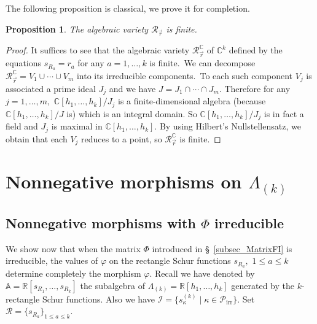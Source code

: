 \documentclass[10pt,a4paper]{amsart}
\newtheorem{prop}[theorem]{Proposition}
\theoremstyle{definition}
\DeclareMathOperator{\irr}{irr}
\begin{document}
The following proposition is classical, we prove it for completion.

\begin{prop}
\label{Prop_Variety}The algebraic variety $\mathcal{R}_{\vec{r}}$ is finite.
\end{prop}

\begin{proof}
It suffices to see that the algebraic variety $\mathcal{R}_{\vec{r}%
}^{\mathbb{C}}$ of $\mathbb{C}^{k}$ defined by the equations $s_{R_{a}}=r_{a}$
for any $a=1,\ldots,k$ is finite.\ We can decompose $\mathcal{R}_{\vec{r}%
}^{\mathbb{C}}=V_{1}\cup\cdots\cup V_{m}$ into its irreducible components.\ To
each such component $V_{j}$ is associated a prime ideal $J_{j}$ and we have
$J=J_{1}\cap\cdots\cap J_{m}$. Therefore for any $j=1,\ldots,m,$
$\mathbb{C}[h_{1},\ldots,h_{k}]/J_{j}$ is a finite-dimensional algebra
(because $\mathbb{C}[h_{1},\ldots,h_{k}]/J$ is) which is an integral domain.
So $\mathbb{C}[h_{1},\ldots,h_{k}]/J_{j}$ is in fact a field and $J_{j}$ is
maximal in $\mathbb{C}[h_{1},\ldots,h_{k}]$. By using Hilbert's
Nullstellensatz, we obtain that each $V_{j}$ reduces to a point, so
$\mathcal{R}_{\vec{r}}^{\mathbb{C}}$ is finite.
\end{proof}

\section{Nonnegative morphisms on \texorpdfstring{$\Lambda_{(k)}$}{Lambda k}}\label{section5}

\subsection{Nonnegative morphisms with \texorpdfstring{$\Phi$}{Phi} irreducible}

We show now that when the matrix $\Phi$ introduced in
\S~\ref{subsec_MatrixFI} is irreducible, the values of $\varphi$ on the
rectangle Schur functions $s_{R_{a}},$ $1\leq a\leq k$ determine completely
the morphism $\varphi$. Recall we have denoted by $\mathbb{A}=\mathbb{R}%
[s_{R_{1}},\ldots,s_{R_{k}}]$ the subalgebra of $\Lambda_{(k)}=\mathbb{R}%
[h_{1},\ldots,h_{k}]$ generated by the $k$-rectangle Schur functions. Also we
have $\mathcal{I}=\{s_{\kappa}^{(k)}\mid\kappa\in\mathcal{P}_{\irr }%
\}$. Set $\mathcal{R}=\{s_{R_{a}}\}_{1\leq a\leq k}$.
\end{document}

